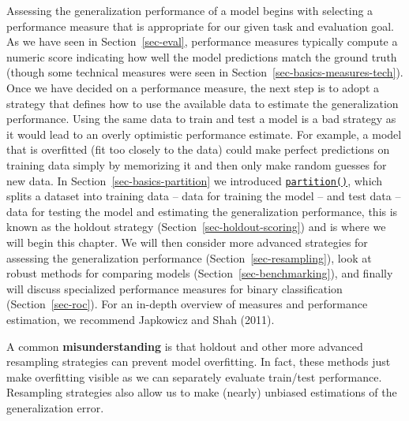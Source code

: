 Assessing the generalization performance of a model begins with
selecting a performance measure that is
appropriate for our given task and evaluation goal. As we have seen in
Section~\ref{sec-eval}, performance measures typically compute a numeric
score indicating how well the model predictions match the ground truth
(though some technical measures were seen in
Section~\ref{sec-basics-measures-tech}). Once we have decided on a
performance measure, the next step is to adopt a strategy that defines
how to use the available data to estimate the generalization
performance. Using the same data to train and test a model is a bad
strategy as it would lead to an overly optimistic performance estimate.
For example, a model that is overfitted (fit too closely to the data)
could make perfect predictions on training data simply by memorizing it
and then only make random guesses for new data. In
Section~\ref{sec-basics-partition} we introduced
\href{https://mlr3.mlr-org.com/reference/partition.html}{\texttt{partition()}},
which splits a dataset into training data -- data
for training the model -- and test data -- data for
testing the model and estimating the generalization performance, this is
known as the holdout strategy (Section~\ref{sec-holdout-scoring}) and is
where we will begin this chapter. We will then consider more advanced
strategies for assessing the generalization performance
(Section~\ref{sec-resampling}), look at robust methods for comparing
models (Section~\ref{sec-benchmarking}), and finally will discuss
specialized performance measures for binary classification
(Section~\ref{sec-roc}). For an in-depth overview of measures and
performance estimation, we recommend Japkowicz and Shah (2011).

\begin{tcolorbox}[enhanced jigsaw, opacitybacktitle=0.6, rightrule=.15mm, opacityback=0, arc=.35mm, breakable, titlerule=0mm, colframe=quarto-callout-warning-color-frame, coltitle=black, bottomrule=.15mm, toprule=.15mm, colback=white, colbacktitle=quarto-callout-warning-color!10!white, bottomtitle=1mm, toptitle=1mm, title=\textcolor{quarto-callout-warning-color}{\faExclamationTriangle}\hspace{0.5em}{Resampling Does Not Avoid Model Overfitting}, leftrule=.75mm, left=2mm]

A common \textbf{misunderstanding} is that holdout and other more
advanced resampling strategies can prevent model overfitting. In fact,
these methods just make overfitting visible as we can separately
evaluate train/test performance. Resampling strategies also allow us to
make (nearly) unbiased estimations of the generalization error.

\end{tcolorbox}

